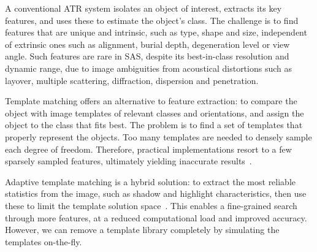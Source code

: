  

A conventional ATR system isolates an object of interest, extracts its key features, and uses these to estimate the object's class. The challenge is to find features that are unique and intrinsic, such as type, shape and size, independent of extrinsic ones such as alignment, burial depth, degeneration level or view angle. Such features are rare in SAS, despite its best-in-class resolution and dynamic range, due to image ambiguities from acoustical distortions such as layover, multiple scattering, diffraction, dispersion and penetration.


Template matching offers an alternative to feature extraction: to compare the object with image templates of relevant classes and orientations, and assign the object to the class that fits best. The problem is to find a set of templates that properly represent the objects. Too many templates are needed to densely sample each degree of freedom. Therefore, practical implementations resort to a few sparsely sampled features, ultimately yielding inaccurate results~\cite{Midelfart2010}.


Adaptive template matching is a hybrid solution: to extract the most reliable statistics from the image, such as shadow and highlight characteristics, then use these to limit the template solution space~\cite{Midelfart2010}. This enables a fine-grained search through more features, at a reduced computational load and improved accuracy. However, we can remove a template library completely by simulating the templates on-the-fly.



